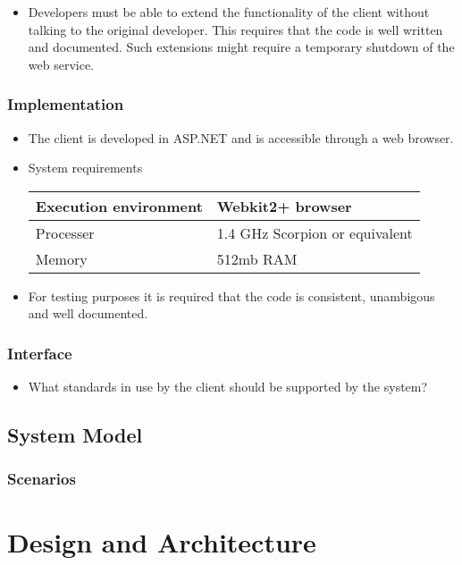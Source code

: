 \documentclass{report}
\begin{document}
\begin{itemize}
\item Developers must be able to extend the functionality of the client without talking to the original developer. This requires that the code is well written and documented. Such extensions might require a temporary shutdown of the web service.
\end{itemize}

\subsection{Implementation}
\begin{itemize}
\item The client is developed in ASP.NET and is accessible through a web browser.
\item System requirements


\begin{tabular}{| l | l | }
\hline
 Execution environment & Webkit2+ browser \\ \hline
 Processer & 1.4 GHz Scorpion or equivalent \\ \hline
 Memory & 512mb RAM  \\ \hline

\end{tabular}

\item For testing purposes it is required that the code is consistent, unambigous and well documented.
\end{itemize}

\subsection{Interface}

\begin{itemize}
\item {\color{red}What standards in use by the client should be supported by the system?}
\end{itemize}
\section{System Model}

\subsection{Scenarios}

\chapter{Design and Architecture}
\end{document}
